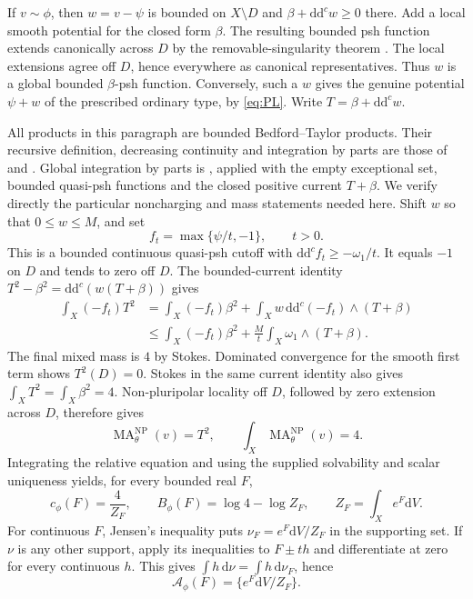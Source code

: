 \documentclass[11pt]{article}
\newcommand{\ddc}{\mathrm d\mathrm d^c}
\begin{document}
If $v\sim\phi$, then $w=v-\psi$ is bounded on $X\setminus D$ and
$\beta+\ddc w\ge0$ there. Add a local smooth potential for the closed
form $\beta$. The resulting bounded psh function extends canonically
across $D$ by the removable-singularity theorem
\cite[Chapter I, Theorem 5.24]{Dem}. The local extensions agree off
$D$, hence everywhere as canonical representatives. Thus $w$ is a
global bounded $\beta$-psh function. Conversely, such a $w$ gives the
genuine potential $\psi+w$ of the prescribed ordinary type, by
\eqref{eq:PL}. Write $T=\beta+\ddc w$.

All products in this paragraph are bounded Bedford--Taylor products.
Their recursive definition, decreasing continuity and integration by
parts are those of \cite[Section 2]{BT82} and
\cite[Chapter III, Section 3]{Dem}. Global integration by parts is
\cite[Theorem 1.14]{BEGZ}, applied with the empty exceptional set,
bounded quasi-psh functions and the closed positive current $T+\beta$.
We verify directly the particular
noncharging and mass statements needed here. Shift $w$ so that
$0\le w\le M$, and set
\[
 f_t=\max\{\psi/t,-1\},\qquad t>0.
\]
This is a bounded continuous quasi-psh cutoff with
$\ddc f_t\ge-\omega_1/t$. It equals $-1$ on $D$ and tends to zero
off $D$. The bounded-current identity
$T^2-\beta^2=\ddc(w(T+\beta))$ gives
\begin{align*}
 \int_X(-f_t)T^2
 &=\int_X(-f_t)\beta^2
             +\int_Xw\,\ddc(-f_t)\wedge(T+\beta)\\
 &\le\int_X(-f_t)\beta^2
             +\frac Mt\int_X\omega_1\wedge(T+\beta).
\end{align*}
The final mixed mass is $4$ by Stokes. Dominated convergence for the
smooth first term shows $T^2(D)=0$. Stokes in the same current identity
also gives $\int_XT^2=\int_X\beta^2=4$. Non-pluripolar locality off
$D$, followed by zero extension across $D$, therefore gives
\[
 \operatorname{MA}_{\theta}^{\mathrm{NP}}(v)=T^2,
 \qquad \int_X\operatorname{MA}_{\theta}^{\mathrm{NP}}(v)=4.
\]
Integrating the relative equation and using the supplied solvability
and scalar uniqueness yields, for every bounded real $F$,
\[
 c_\phi(F)=\frac4{Z_F},\qquad
 B_\phi(F)=\log4-\log Z_F,\qquad Z_F=\int_Xe^F\mathrm dV.
\]
For continuous $F$, Jensen's inequality puts
$\nu_F=e^F\mathrm dV/Z_F$ in the supporting set. If $\nu$ is any
other support, apply its inequalities to $F\pm th$ and differentiate
at zero for every continuous $h$. This gives
$\int h\,\mathrm d\nu=\int h\,\mathrm d\nu_F$, hence
\[
 \mathcal A_\phi(F)=\{e^F\mathrm dV/Z_F\}.
\]
\end{document}

